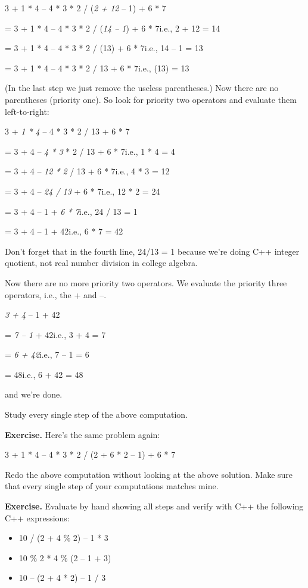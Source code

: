 \documentclass[
]{article}
\providecommand{\tightlist}{%
  \setlength{\itemsep}{0pt}\setlength{\parskip}{0pt}}
\begin{document}
3 + 1 * 4 -- 4 * 3 * 2 / (\emph{2 + 12} -- 1) + 6 * 7

= 3 + 1 * 4 -- 4 * 3 * 2 / (\emph{14 -- 1}) + 6 * 7i.e., 2 + 12 = 14

= 3 + 1 * 4 -- 4 * 3 * 2 / (13) + 6 * 7i.e., 14 -- 1 = 13

= 3 + 1 * 4 -- 4 * 3 * 2 / 13 + 6 * 7i.e., (13) = 13

(In the last step we just remove the useless parentheses.) Now there are
no parentheses (priority one). So look for priority two operators and
evaluate them left-to-right:

3 + \emph{1 * 4} -- 4 * 3 * 2 / 13 + 6 * 7

= 3 + 4 -- \emph{4 * 3} * 2 / 13 + 6 * 7i.e., 1 * 4 = 4

= 3 + 4 -- \emph{12 * 2} / 13 + 6 * 7i.e., 4 * 3 = 12

= 3 + 4 -- \emph{24 / 13} + 6 * 7i.e., 12 * 2 = 24

= 3 + 4 -- 1 + \emph{6 * 7}i.e., 24 / 13 = 1

= 3 + 4 -- 1 + 42i.e., 6 * 7 = 42

Don't forget that in the fourth line, 24/13 = 1 because we're doing C++
integer quotient, not real number division in college algebra.

Now there are no more priority two operators. We evaluate the priority
three operators, i.e., the + and --.

\emph{3 + 4} -- 1 + 42

= \emph{7 -- 1} + 42i.e., 3 + 4 = 7

= \emph{6 + 42}i.e., 7 -- 1 = 6

= 48i.e., 6 + 42 = 48

and we're done.

Study every single step of the above computation.

\textbf{Exercise.} Here's the same problem again:

3 + 1 * 4 -- 4 * 3 * 2 / (2 + 6 * 2 -- 1) + 6 * 7

Redo the above computation without looking at the above solution. Make
sure that every single step of your computations matches mine.

\textbf{Exercise.} Evaluate by hand showing all steps and verify with
C++ the following C++ expressions:

\begin{itemize}
\tightlist
\item
  10 / (2 + 4 \% 2) -- 1 * 3
\item
  10 \% 2 * 4 \% (2 -- 1 + 3)
\item
  10 -- (2 + 4 * 2) -- 1 / 3
\end{itemize}
\end{document}
